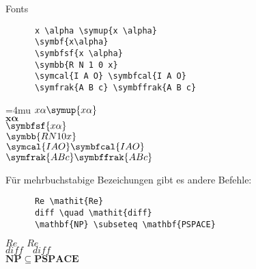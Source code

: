 \begin{frame}[fragile]{
  Fonts
  \hfill
}
  \begin{CodeExample}{0.70}
    \begin{verbatim}
      x \alpha \symup{x \alpha}
      \symbf{x\alpha}
      \symbfsf{x \alpha}
      \symbb{R N 1 0 x}
      \symcal{I A O} \symbfcal{I A O}
      \symfrak{A B c} \symbffrak{A B c}
    \end{verbatim}
  \CodeResult
    \strut
    \Umathordordspacing\textstyle=4mu
    $x \alpha \symup{x \alpha}$ \\
    $\symbf{x \alpha}$ \\
    $\symbfsf{x \alpha}$ \\
    $\symbb{R N 1 0 x}$ \\
    $\symcal{I A O} \symbfcal{I A O}$ \\
    $\symfrak{A B c} \symbffrak{A B c}$
  \end{CodeExample}

  Für mehrbuchstabige Bezeichungen gibt es andere Befehle:
  \begin{CodeExample}{0.70}
    \begin{verbatim}
      Re \mathit{Re}
      diff \quad \mathit{diff}
      \mathbf{NP} \subseteq \mathbf{PSPACE}
    \end{verbatim}
  \CodeResult
    \strut
    $Re \quad \mathit{Re}$ \\
    $diff \quad \mathit{diff}$ \\
    $\mathbf{NP} \subseteq \mathbf{PSPACE}$
  \end{CodeExample}
\end{frame}

